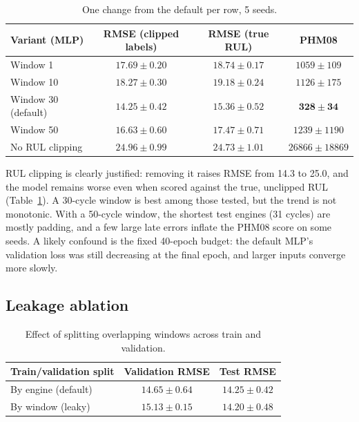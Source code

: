 \documentclass[11pt,a4paper]{article}
\begin{document}
\begin{table}[h]
\centering
\small
\begin{tabular}{lccc}
\toprule
Variant (MLP) & RMSE (clipped labels) & RMSE (true RUL) & PHM08 \\
\midrule
Window 1               & $17.69 \pm 0.20$ & $18.74 \pm 0.17$ & $1059 \pm 109$ \\
Window 10              & $18.27 \pm 0.30$ & $19.18 \pm 0.24$ & $1126 \pm 175$ \\
Window 30 (default)    & $\mathbf{14.25 \pm 0.42}$ & $\mathbf{15.36 \pm 0.52}$ & $\mathbf{328 \pm 34}$ \\
Window 50              & $16.63 \pm 0.60$ & $17.47 \pm 0.71$ & $1239 \pm 1190$ \\
No RUL clipping        & $24.96 \pm 0.99$ & $24.73 \pm 1.01$ & $26866 \pm 18869$ \\
\bottomrule
\end{tabular}
\caption{One change from the default per row, 5 seeds.}
\label{tab:prep}
\end{table}

RUL clipping is clearly justified: removing it raises RMSE from 14.3 to 25.0,
and the model remains worse even when scored against the true, unclipped RUL
(Table~\ref{tab:prep}). A 30-cycle window is best among those tested, but the
trend is not monotonic. With a 50-cycle window, the shortest test engines (31
cycles) are mostly padding, and a few large late errors inflate the PHM08
score on some seeds. A likely confound is the fixed 40-epoch budget: the
default MLP's validation loss was still decreasing at the final epoch, and
larger inputs converge more slowly.

\subsection{Leakage ablation}

\begin{table}[h]
\centering
\small
\begin{tabular}{lcc}
\toprule
Train/validation split & Validation RMSE & Test RMSE \\
\midrule
By engine (default) & $14.65 \pm 0.64$ & $14.25 \pm 0.42$ \\
By window (leaky)   & $15.13 \pm 0.15$ & $14.20 \pm 0.48$ \\
\bottomrule
\end{tabular}
\caption{Effect of splitting overlapping windows across train and validation.}
\label{tab:leak}
\end{table}
\end{document}
